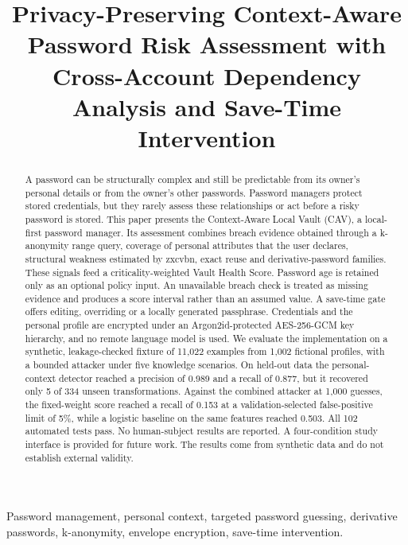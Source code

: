 \documentclass[conference]{IEEEtran}
\begin{document}
\title{Privacy-Preserving Context-Aware Password Risk Assessment with Cross-Account Dependency Analysis and Save-Time Intervention}

\author{
}

\maketitle

\begin{abstract}
A password can be structurally complex and still be predictable from its owner's personal details or from the owner's other passwords. Password managers protect stored credentials, but they rarely assess these relationships or act before a risky password is stored. This paper presents the Context-Aware Local Vault (CAV), a local-first password manager. Its assessment combines breach evidence obtained through a k-anonymity range query, coverage of personal attributes that the user declares, structural weakness estimated by zxcvbn, exact reuse and derivative-password families. These signals feed a criticality-weighted Vault Health Score. Password age is retained only as an optional policy input. An unavailable breach check is treated as missing evidence and produces a score interval rather than an assumed value. A save-time gate offers editing, overriding or a locally generated passphrase. Credentials and the personal profile are encrypted under an Argon2id-protected AES-256-GCM key hierarchy, and no remote language model is used. We evaluate the implementation on a synthetic, leakage-checked fixture of 11,022 examples from 1,002 fictional profiles, with a bounded attacker under five knowledge scenarios. On held-out data the personal-context detector reached a precision of 0.989 and a recall of 0.877, but it recovered only 5 of 334 unseen transformations. Against the combined attacker at 1,000 guesses, the fixed-weight score reached a recall of 0.153 at a validation-selected false-positive limit of 5\%, while a logistic baseline on the same features reached 0.503. All 102 automated tests pass. No human-subject results are reported. A four-condition study interface is provided for future work. The results come from synthetic data and do not establish external validity.
\end{abstract}

\begin{IEEEkeywords}
Password management, personal context, targeted password guessing, derivative passwords, k-anonymity, envelope encryption, save-time intervention.
\end{IEEEkeywords}
\end{document}
